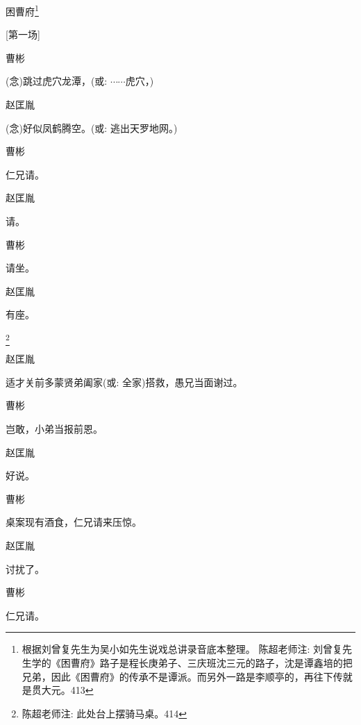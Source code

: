 
\newpage


{困曹府}\footnote{ 根据刘曾复先生为吴小如先生说戏总讲录音底本整理。  陈超老师注: 刘曾复先生学的《困曹府》路子是程长庚弟子、三庆班沈三元的路子，沈是谭鑫培的把兄弟，因此《困曹府》的传承不是谭派。而另外一路是李顺亭的，再往下传就是贯大元。{413}}

{{[}第一场{]}}

{曹彬\hspace{30pt}~

({\akai 念})跳过虎穴龙潭，({\akai 或}: $\cdots{}\cdots{}$虎穴，)}

{赵匡胤\hspace{20pt}~

({\akai 念})好似凤鹤腾空。({\akai 或}: 逃出天罗地网。)}

{曹彬\hspace{30pt}~

仁兄请。}

{赵匡胤\hspace{20pt}~

请。}

{曹彬\hspace{30pt}~

请坐。}

{赵匡胤\hspace{20pt}~

有座。}\footnote{

陈超老师注: 此处台上摆骑马桌。{414}}

赵匡胤\hspace{20pt}~

适才关前多蒙贤弟阖家({\akai 或}: 全家)搭救，愚兄当面谢过。

{曹彬\hspace{30pt}~

岂敢，小弟当报前恩。}

赵匡胤\hspace{20pt}~

{好说。}

{曹彬\hspace{30pt}~

桌案现有酒食，仁兄请来压惊。}

{赵匡胤\hspace{20pt}~

讨扰了。}

{曹彬\hspace{30pt}~

仁兄请。}

